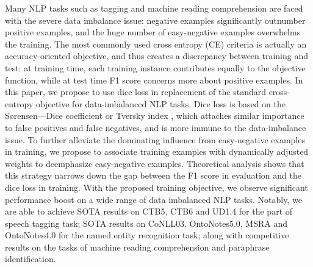 Many NLP tasks such as tagging and machine reading comprehension are faced with the severe  data imbalance issue:  negative examples significantly outnumber positive examples, and the huge number of easy-negative examples overwhelms the training. The most commonly used cross entropy (CE) criteria is actually an accuracy-oriented objective, and thus creates a discrepancy between training and test: at training time, each training instance contributes equally to the objective function, while at test time F1 score concerns more about positive examples. In this paper, we propose to use dice loss in replacement of the standard cross-entropy objective for data-imbalanced NLP tasks. Dice loss is  based on the Sørensen---Dice coefficient or Tversky index , which attaches similar importance to false positives and false negatives, and is  more immune to the data-imbalance issue. To further alleviate the dominating influence from easy-negative examples in training, we propose to associate training examples with dynamically adjusted weights to deemphasize easy-negative examples. Theoretical analysis shows that this strategy narrows down the gap between the F1  score in evaluation and the dice  loss in training. With the proposed training objective, we observe  significant performance boost on a wide range of data imbalanced  NLP tasks. Notably, we are able to achieve  SOTA results  on CTB5,  CTB6 and UD1.4 for the part of speech tagging  task;  SOTA results on CoNLL03, OntoNotes5.0, MSRA and OntoNotes4.0 for the named entity recognition  task; along with competitive results on the tasks of machine reading comprehension and paraphrase identification.
